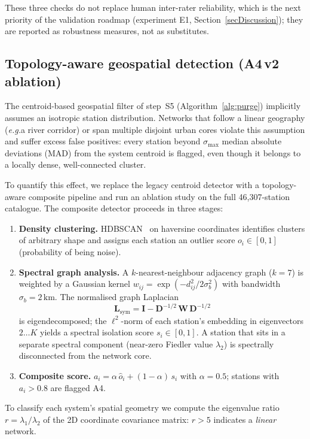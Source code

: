 \documentclass[11pt,a4paper]{article}
\newcommand{\eg}{\emph{e.g.}}
\begin{document}
These three checks do not replace human inter-rater reliability, which
is the next priority of the validation roadmap (experiment E1,
Section~\ref{secDiscussion}); they are reported as robustness
measures, not as substitutes.

\subsection{Topology-aware geospatial detection (A4\,v2 ablation)}\label{secAblation}
The centroid-based geospatial filter of step~S5 (Algorithm~\ref{alg:purge})
implicitly assumes an isotropic station distribution. Networks that
follow a linear geography (\eg a river corridor) or span multiple
disjoint urban cores violate this assumption and suffer excess false
positives: every station beyond $\sigma_{\max}$ median absolute
deviations (MAD) from the system centroid is flagged, even though it
belongs to a locally dense, well-connected cluster.

To quantify this effect, we replace the legacy centroid detector with a
topology-aware composite pipeline and run an ablation study on the full
46{,}307-station catalogue. The composite detector proceeds in three
stages:
%
\begin{enumerate}[nosep]
\item \textbf{Density clustering.} HDBSCAN~\cite{Campello2013HDBSCAN,McInnes2017HDBSCAN}
      on haversine coordinates identifies clusters of arbitrary shape
      and assigns each station an outlier score
      $o_i \in [0,1]$ (probability of being noise).
\item \textbf{Spectral graph analysis.} A $k$-nearest-neighbour
      adjacency graph ($k = 7$) is weighted by a Gaussian kernel
      $w_{ij} = \exp(-d_{ij}^2 / 2\sigma_b^2)$ with bandwidth
      $\sigma_b = 2\,\text{km}$. The normalised graph Laplacian
      \begin{equation}\label{eq:laplacian}
        \mathbf{L}_{\text{sym}} = \mathbf{I}
          - \mathbf{D}^{-1/2}\,\mathbf{W}\,\mathbf{D}^{-1/2}
      \end{equation}
      is eigendecomposed; the $\ell^2$-norm of each station's
      embedding in eigenvectors $2 \ldots K$ yields a spectral
      isolation score $s_i \in [0,1]$. A station that sits in a
      separate spectral component (near-zero Fiedler value $\lambda_2$)
      is spectrally disconnected from the network core.
\item \textbf{Composite score.}
      $a_i = \alpha\,\hat o_i + (1-\alpha)\,s_i$
      with $\alpha = 0.5$; stations with $a_i > 0.8$ are flagged A4.
\end{enumerate}
%
To classify each system's spatial geometry we compute the eigenvalue
ratio $r = \lambda_1 / \lambda_2$ of the 2D coordinate covariance
matrix: $r > 5$ indicates a \emph{linear} network.
\end{document}
